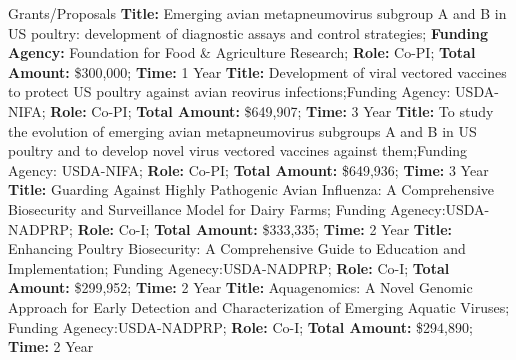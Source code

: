 \begin{rubric}{Grants/Proposals}
\entrya[] \textbf{Title:} Emerging avian metapneumovirus subgroup A and B in US poultry: development of diagnostic assays and control strategies; \textbf{Funding Agency:} Foundation for Food \& Agriculture Research; \textbf{Role:} Co-PI; \textbf{Total Amount:} \$300,000; \textbf{Time:} 1 Year
\entrya[] \textbf{Title:} Development of viral vectored vaccines to protect US poultry against avian reovirus infections;{Funding Agency:} USDA-NIFA; \textbf{Role:} Co-PI; \textbf{Total Amount:} \$649,907; \textbf{Time:} 3 Year
\entrya[] \textbf{Title:} To study the evolution of emerging avian metapneumovirus subgroups A and B in US poultry and to develop novel virus vectored vaccines against them;{Funding Agency:} USDA-NIFA; \textbf{Role:} Co-PI; \textbf{Total Amount:} \$649,936; \textbf{Time:} 3 Year
\entrya[] \textbf{Title:} Guarding Against Highly Pathogenic Avian Influenza: A Comprehensive Biosecurity and Surveillance Model
for Dairy Farms; {Funding Agenecy:}USDA-NADPRP; \textbf{Role:} Co-I; \textbf{Total Amount:} \$333,335; \textbf{Time:} 2 Year
\entrya[] \textbf{Title:} Enhancing Poultry Biosecurity: A Comprehensive Guide to Education and Implementation; {Funding Agenecy:}USDA-NADPRP; \textbf{Role:} Co-I; \textbf{Total Amount:} \$299,952; \textbf{Time:} 2 Year
\entrya[] \textbf{Title:} Aquagenomics: A Novel Genomic Approach for Early Detection and Characterization of Emerging Aquatic
Viruses; {Funding Agenecy:}USDA-NADPRP; \textbf{Role:} Co-I; \textbf{Total Amount:} \$294,890; \textbf{Time:} 2 Year
\end{rubric}